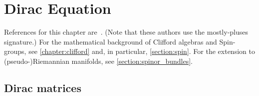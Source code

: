 \chapter{Dirac Equation}\label{chapter:dirac}

    References for this chapter are~\citet{van_proeyen_supergravity_2012}. (Note that these authors use the mostly-pluses signature.) For the mathematical background of Clifford algebras and Spin-groups, see \cref{chapter:clifford} and, in particular, \cref{section:spin}. For the extension to (pseudo-)Riemannian manifolds, see \cref{section:spinor_bundles}.

    \minitoc

\section{Dirac matrices}

